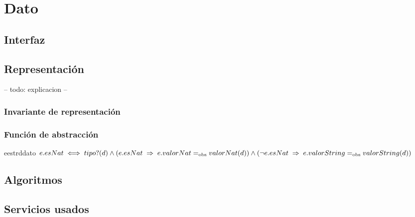 \section{Dato}

\subsection{Interfaz}

\iusa{}

\ioperaciones

\subsection{Representación}

-- todo: explicacion --


\subsubsection{Invariante de representación}


\subsubsection{Función de abstracción}

\begin{ABS}{e}{estr}{d}{dato}
    $
    e.esNat \iff tipo?(d) \land \\
    (e.esNat \implies e.valorNat \igobs valorNat(d)) \land \\
    (\neg e.esNat \implies e.valorString \igobs valorString(d))
    $
\end{ABS}

\subsection{Algoritmos}

\subsection{Servicios usados}

